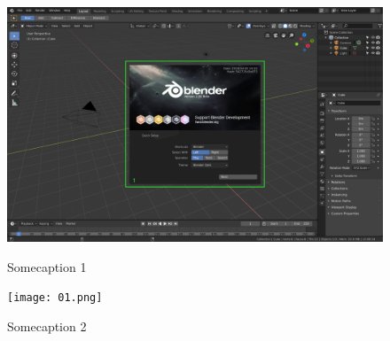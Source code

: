 \documentclass[12pt]{article}
\begin{document}
\begin{figure}[ht]
    \centering
    \begin{minipage}[ht]{0.495\textwidth}
        \includegraphics[width=\textwidth]{01.jpg}
        \caption{Somecaption 1}
        \label{fig:01}
    \end{minipage}
    \hfill
    \begin{minipage}[ht]{0.495\textwidth}
        \texttt{[image: 01.png]}
        \caption{Somecaption 2}
        \label{fig:02}
    \end{minipage}
\end{figure}

\justify


\nocite{*}
\end{document}
